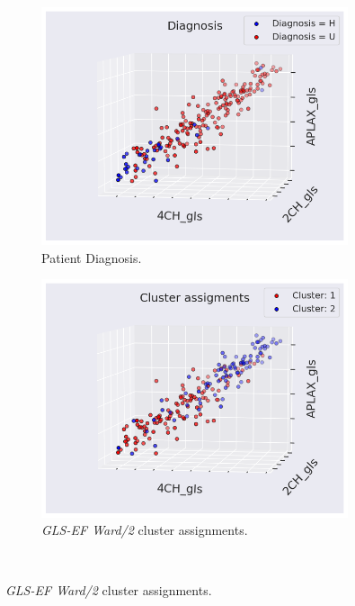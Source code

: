 \begin{figure}[htb]
    \centering
    \begin{subfigure}[b]{0.49\textwidth}
        \centering
        \includegraphics[width=0.99\textwidth]{results/pd/scatter_gls_indication_bin.png}
        \caption{Patient Diagnosis.}
        \label{fig:scatter_gls_ef_hf}
    \end{subfigure}
    \begin{subfigure}[b]{0.49\textwidth}
        \centering
        \includegraphics[width=0.99\textwidth]{results/pd/scatter_gls_EF_ward2.png}
        \caption{\textit{GLS-EF Ward/2} cluster assignments.}
        \label{fig:scatter_gls_ef_ward2}
    \end{subfigure}\\

\end{figure}
